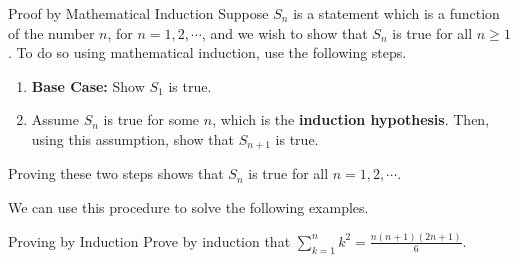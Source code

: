 \begin{procedure}{Proof by Mathematical Induction}\label{proc:mathinduction}
Suppose $S_{n}$ is a statement which is a function of the number $n$, for $n=1,2,\cdots$, and
we wish to show that $S_{n}$ is true for all $n \geq 1$. To do so using mathematical induction,  use the 
following steps.
\begin{enumerate}
\item \textbf{Base Case:}  Show $S_{1}$ is true.

\item Assume $S_{n}$ is true for some $n$, which is the \textbf{induction hypothesis}.  Then, using this assumption, 
show that $S_{n+1}$ is true. 
\end{enumerate}

Proving these two steps shows that $S_{n}$ is true for all $n = 1,2,\cdots$.
\end{procedure}

We can use this procedure to solve the following examples.

\begin{example}{Proving by Induction}\label{exa:proofbyinduction}
Prove by induction that $\sum_{k=1}^{n}k^{2}=\displaystyle
\frac{n\left( n+1\right) \left( 2n+1\right) }{6}$.
\end{example}

